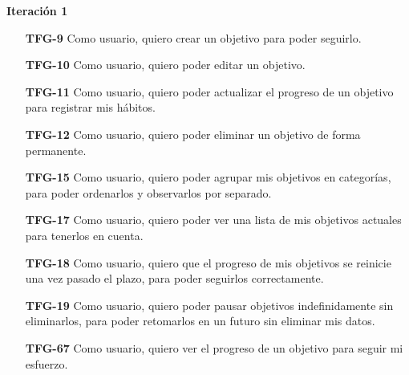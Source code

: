 \documentclass[10pt, a4paper]{aqademic}
\begin{document}
\textbf{Iteración 1}
\begin{itemize}[leftmargin=16mm]
	\item [\textbf{TFG-9}] Como usuario, quiero crear un objetivo para poder seguirlo.
	
	\item [\textbf{TFG-10}] Como usuario, quiero poder editar un objetivo.
	
	\item [\textbf{TFG-11}] Como usuario, quiero poder actualizar el progreso de un objetivo para registrar mis hábitos.
	
	\item [\textbf{TFG-12}] Como usuario, quiero poder eliminar un objetivo de forma permanente.
	
	\item [\textbf{TFG-15}] Como usuario, quiero poder agrupar mis objetivos en categorías, para poder ordenarlos y observarlos por separado.
	
	\item [\textbf{TFG-17}] Como usuario, quiero poder ver una lista de mis objetivos actuales para tenerlos en cuenta.
	
	\item [\textbf{TFG-18}] Como usuario, quiero que el progreso de mis objetivos se reinicie una vez pasado el plazo, para poder seguirlos correctamente.

	
	\item [\textbf{TFG-19}] Como usuario, quiero poder pausar objetivos indefinidamente sin eliminarlos, para poder retomarlos en un futuro sin eliminar mis datos.
	
	\item [\textbf{TFG-67}] Como usuario, quiero ver el progreso de un objetivo para seguir mi esfuerzo.
\end{itemize}
\end{document}
